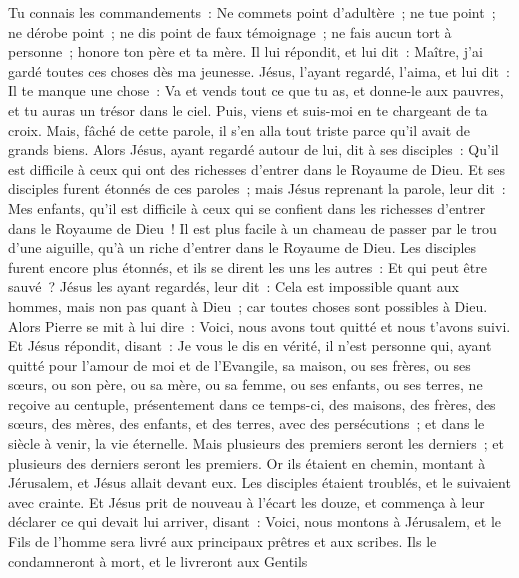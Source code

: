 \begin{multicols}{2}
Tu connais les commandements~: Ne commets point d'adultère~; ne tue point~; ne dérobe point~; ne dis point de faux témoignage~; ne fais aucun tort à personne~; honore ton père et ta mère.
Il lui répondit, et lui dit~: Maître, j'ai gardé toutes ces choses dès ma jeunesse.
Jésus, l'ayant regardé, l'aima, et lui dit~: Il te manque une chose~: Va et vends tout ce que tu as, et donne-le aux pauvres, et tu auras un trésor dans le ciel. Puis, viens et suis-moi en te chargeant de ta croix.
Mais, fâché de cette parole, il s'en alla tout triste parce qu'il avait de grands biens.
Alors Jésus, ayant regardé autour de lui, dit à ses disciples~: Qu'il est difficile à ceux qui ont des richesses d'entrer dans le Royaume de Dieu.
Et ses disciples furent étonnés de ces paroles~; mais Jésus reprenant la parole, leur dit~: Mes enfants, qu'il est difficile à ceux qui se confient dans les richesses d'entrer dans le Royaume de Dieu~!
Il est plus facile à un chameau de passer par le trou d'une aiguille, qu'à un riche d'entrer dans le Royaume de Dieu.
Les disciples furent encore plus étonnés, et ils se dirent les uns les autres~: Et qui peut être sauvé~?
Jésus les ayant regardés, leur dit~: Cela est impossible quant aux hommes, mais non pas quant à Dieu~; car toutes choses sont possibles à Dieu.
Alors Pierre se mit à lui dire~: Voici, nous avons tout quitté et nous t'avons suivi.
Et Jésus répondit, disant~: Je vous le dis en vérité, il n'est personne qui, ayant quitté pour l'amour de moi et de l'Evangile, sa maison, ou ses frères, ou ses sœurs, ou son père, ou sa mère, ou sa femme, ou ses enfants, ou ses terres,
ne reçoive au centuple, présentement dans ce temps-ci, des maisons, des frères, des sœurs, des mères, des enfants, et des terres, avec des persécutions~; et dans le siècle à venir, la vie éternelle.
Mais plusieurs des premiers seront les derniers~; et plusieurs des derniers seront les premiers.
Or ils étaient en chemin, montant à Jérusalem, et Jésus allait devant eux. Les disciples étaient troublés, et le suivaient avec crainte. Et Jésus prit de nouveau à l'écart les douze, et commença à leur déclarer ce qui devait lui arriver,
disant~: Voici, nous montons à Jérusalem, et le Fils de l'homme sera livré aux principaux prêtres et aux scribes. Ils le condamneront à mort, et le livreront aux Gentils

\end{multicols}
